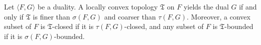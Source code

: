 Let $\langle F, G \rangle$ be a duality. A locally convex topology $\mathfrak{T}$ on $F$ yields the dual $G$ if and only if $\mathfrak{T}$ is finer than $\sigma(F, G)$ and coarser than $\tau(F, G)$. Moreover, a convex subset of $F$ is $\mathfrak{T}$-closed if it is $\tau(F, G)$-closed, and any subset of $F$ is $\mathfrak{T}$-bounded if it is $\sigma(F, G)$-bounded.
